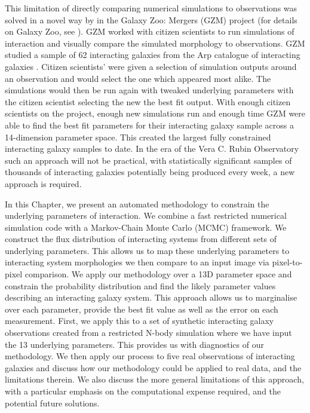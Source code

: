 This limitation of directly comparing numerical simulations to observations was solved in a novel way by \citet{2016MNRAS.459..720H} in the Galaxy Zoo: Mergers (GZM) project (for details on Galaxy Zoo, see \citet{2008MNRAS.389.1179L}). GZM worked with citizen scientists to run simulations of interaction and visually compare the simulated morphology to observations. GZM studied a sample of 62 interacting galaxies from the Arp catalogue of interacting galaxies \citep{1966ApJS...14....1A}. Citizen scientists' were given a selection of simulation outputs around an observation and would select the one which appeared most alike. The simulations would then be run again with tweaked underlying parameters with the citizen scientist selecting the new the best fit output. With enough citizen scientists on the project, enough new simulations run and enough time GZM were able to find the best fit parameters for their interacting galaxy sample across a 14-dimension parameter space. This created the largest fully constrained interacting galaxy samples to date. In the era of the Vera C. Rubin Observatory such an approach will not be practical, with statistically significant samples of thousands of interacting galaxies potentially being produced every week, a new approach is required.

In this Chapter, we present an automated methodology to constrain the underlying parameters of interaction. We combine a fast restricted numerical simulation code with a Markov-Chain Monte Carlo (MCMC) framework. We construct the flux distribution of interacting systems from different sets of underlying parameters. This allows us to map these underlying parameters to interacting system morphologies we then compare to an input image via pixel-to-pixel comparison. We apply our methodology over a 13D parameter space and constrain the probability distribution and find the likely parameter values describing an interacting galaxy system. This approach allows us to marginalise over each parameter, provide the best fit value as well as the error on each measurement. First, we apply this to a set of synthetic interacting galaxy observations created from a restricted N-body simulation where we have input the 13 underlying parameters. This provides us with diagnostics of our methodology. We then apply our process to five real observations of interacting galaxies and discuss how our methodology could be applied to real data, and the limitations therein. We also discuss the more general limitations of this approach, with a particular emphasis on the computational expense required, and the potential future solutions.

